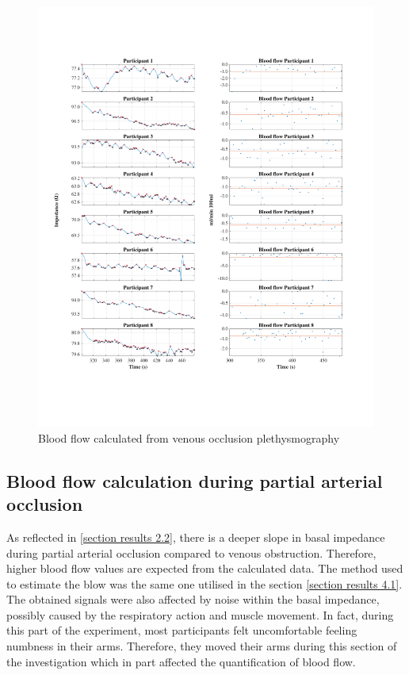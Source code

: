 \begin{figure}
	\includegraphics[width=\textwidth,height=\textheight,keepaspectratio,trim={0.5cm 0.5cm 2cm 2cm},clip]{figure12}    
	\caption{Blood flow calculated from venous occlusion plethysmography}
	\label{fig:blood_flow:venous_occlusion}
\end{figure}

\subsection{Blood flow calculation during partial arterial occlusion}
\label{section results 4.2}
As reflected in \ref{section results 2.2}, there is a deeper slope in basal impedance during partial arterial occlusion compared to venous obstruction. Therefore, higher blood flow values are expected from the calculated data. The method used to estimate the blow was the same one utilised in the section \ref{section results 4.1}. The obtained signals were also affected by noise within the basal impedance, possibly caused by the respiratory action and muscle movement. In fact, during this part of the experiment, most participants felt uncomfortable feeling numbness in their arms. Therefore, they moved their arms during this section of the investigation which in part affected the quantification of blood flow.

